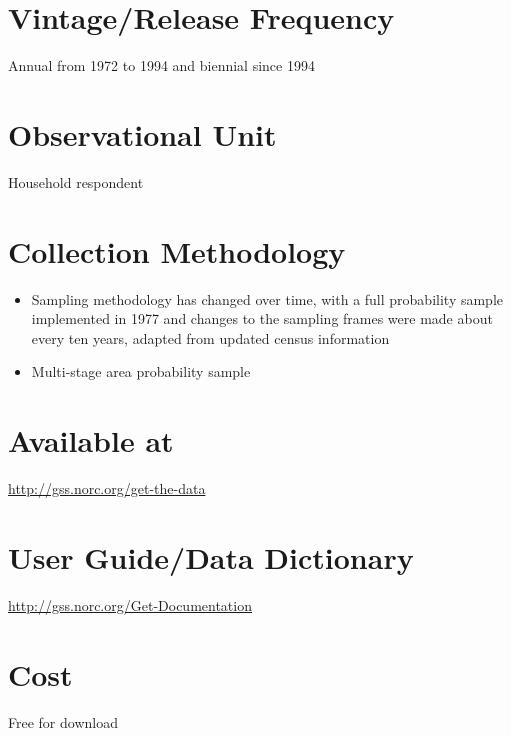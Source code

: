 \documentclass[
]{book}
\providecommand{\tightlist}{%
  \setlength{\itemsep}{0pt}\setlength{\parskip}{0pt}}
\begin{document}
\hypertarget{vintagerelease-frequency-27}{%
\section{Vintage/Release Frequency}\label{vintagerelease-frequency-27}}

Annual from 1972 to 1994 and biennial since 1994

\hypertarget{observational-unit-27}{%
\section{Observational Unit}\label{observational-unit-27}}

Household respondent

\hypertarget{collection-methodology-27}{%
\section{Collection Methodology}\label{collection-methodology-27}}

\begin{itemize}
\tightlist
\item
  Sampling methodology has changed over time, with a full probability sample implemented in 1977 and changes to the sampling frames were made about every ten years, adapted from updated census information
\item
  Multi-stage area probability sample
\end{itemize}

\hypertarget{available-at-27}{%
\section{Available at}\label{available-at-27}}

\url{http://gss.norc.org/get-the-data}

\hypertarget{user-guidedata-dictionary-27}{%
\section{User Guide/Data Dictionary}\label{user-guidedata-dictionary-27}}

\url{http://gss.norc.org/Get-Documentation}

\hypertarget{cost-27}{%
\section{Cost}\label{cost-27}}

Free for download
\end{document}
